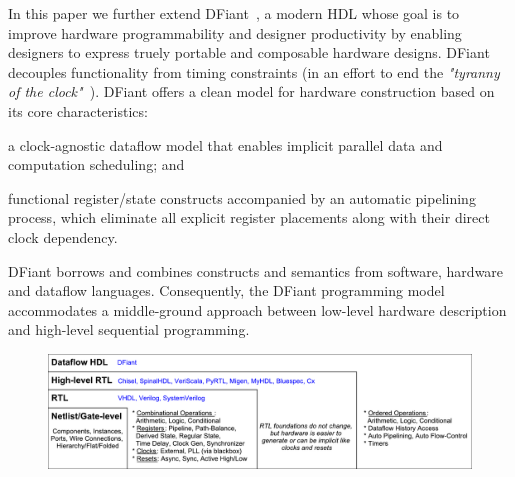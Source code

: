 
In this paper we further extend DFiant~\cite{Port2017}, a modern HDL whose goal is to improve hardware programmability and designer productivity by enabling designers to express truely portable and composable hardware designs.
DFiant decouples functionality from timing constraints (in an effort to end the \emph{"tyranny of the clock"}~\cite{Sutherland2012}). DFiant offers a clean model for hardware construction based on its core characteristics:
\begin{enumerate*}[label=(\roman*)]
\item
  a clock-agnostic dataflow model that enables implicit parallel data and computation scheduling; and
\item
  functional register/state constructs accompanied by an automatic pipelining process, which eliminate all explicit register placements along with their direct clock dependency.
\end{enumerate*} DFiant borrows and combines constructs and semantics from software, hardware and dataflow languages. Consequently, the DFiant programming model accommodates a middle-ground approach between low-level hardware description and high-level sequential programming. 

\begin{figure}[t]
	\centering
	\captionsetup{justification=centering}
	\includegraphics[width=\linewidth]{graphics/motivation.pdf} 
	\label{fig:motivation}
\end{figure}

